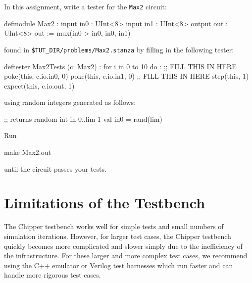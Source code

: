 In this assignment, write a tester for the \verb+Max2+ circuit:

\begin{stanza}
defmodule Max2 :
  input  in0 : UInt<8>
  input  in1 : UInt<8>
  output out : UInt<8>
  out := mux(in0 > in0, in0, in1)
\end{stanza}

\noindent
found in \verb+$TUT_DIR/problems/Max2.stanza+ by filling in the following tester:

\begin{stanza}
deftester Max2Tests (c: Max2) :
  for i in 0 to 10 do :
    ;; FILL THIS IN HERE
    poke(this, c.io.in0, 0)
    poke(this, c.io.in1, 0)
    ;; FILL THIS IN HERE
    step(this, 1)
    expect(this, c.io.out, 1)
\end{stanza}

\noindent 
using random integers generated as follows:

\begin{stanza}
;; returns random int in 0..lim-1
val in0 = rand(lim) 
\end{stanza}

\noindent
Run 

\begin{bash}
make Max2.out
\end{bash}

\noindent 
until the circuit passes your tests.

\section{Limitations of the Testbench}

The Chipper testbench works well for simple tests and small numbers of simulation iterations. However, for larger test cases, the Chipper testbench quickly becomes more complicated and slower simply due to the inefficiency of the infrastructure. For these larger and more complex test cases, we recommend using the C++ emulator or Verilog test harnesses which run faster and can handle more rigorous test cases.

